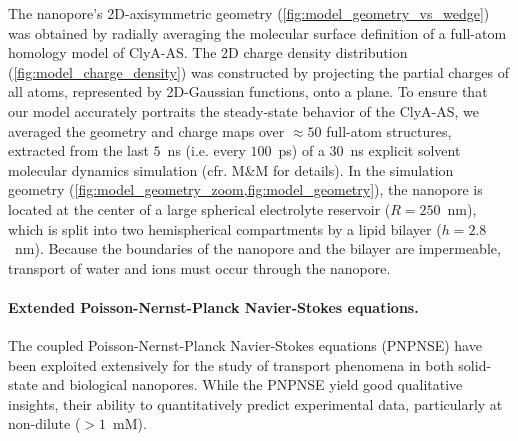 \documentclass[journal=ancac3,manuscript=article,etalmode=truncate,maxauthors=0,layout=twocolumn]{achemso}
\begin{document}
The nanopore's 2D-axisymmetric geometry (\cref{fig:model_geometry_vs_wedge}) was obtained by radially
averaging the molecular surface definition of a full-atom homology model of ClyA-AS. The 2D charge density
distribution (\cref{fig:model_charge_density}) was constructed by projecting the partial charges of all
atoms, represented by 2D-Gaussian functions, onto a plane. To ensure that our model accurately portraits the
steady-state behavior of the ClyA-AS, we averaged the geometry and charge maps over $\approx50$ full-atom
structures, extracted from the last $5$~ns (i.e. every $100$~ps) of a $30$~ns explicit solvent molecular
dynamics simulation (cfr. M\&M for details). In the simulation geometry
(\cref{fig:model_geometry_zoom,fig:model_geometry}),
the nanopore is located at the center of a large spherical electrolyte reservoir ($R=250$~nm), which is split
into two hemispherical compartments by a lipid bilayer ($h=2.8$~nm). Because the boundaries of the nanopore
and the bilayer are impermeable, transport of water and ions must occur through the nanopore.



\paragraph{Extended Poisson-Nernst-Planck Navier-Stokes equations.}
The coupled Poisson-Nernst-Planck Navier-Stokes equations (PNPNSE) have been exploited extensively for the
study of transport phenomena in both solid-state\cite{Daiguji-2004,Lu-2012} and biological
nanopores.\cite{Eisenberg-1996,Simakov-2010, Pederson-2015} While the PNPNSE yield good qualitative insights,
their ability to quantitatively predict experimental data, particularly at non-dilute ($>1$~mM).
\end{document}
